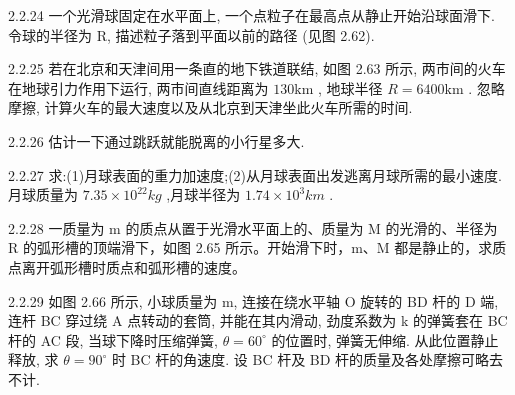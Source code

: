 \begin{problem}{2.2.24}
一个光滑球固定在水平面上, 一个点粒子在最高点从静止开始沿球面滑下. 令球的半径为 R, 描述粒子落到平面以前的路径 (见图 2.62).
\begin{center}

\end{center}
\end{problem}
\clearpage


\begin{problem}{2.2.25}
若在北京和天津间用一条直的地下铁道联结, 如图 2.63 所示, 两市间的火车在地球引力作用下运行, 两市间直线距离为 $130\mathrm{km}$ , 地球半径 $R = 6400\mathrm{km}$ . 忽略摩擦, 计算火车的最大速度以及从北京到天津坐此火车所需的时间.
\begin{center}

\end{center}
\end{problem}
\clearpage


\begin{problem}{2.2.26}
估计一下通过跳跃就能脱离的小行星多大.
\end{problem}
\clearpage


\begin{problem}{2.2.27}
求:(1)月球表面的重力加速度;(2)从月球表面出发逃离月球所需的最小速度.月球质量为 $7.35\times10^{22}kg$ ,月球半径为 $1.74\times10^{3}km$ .
\end{problem}
\clearpage


\begin{problem}{2.2.28}
一质量为 m 的质点从置于光滑水平面上的、质量为 M 的光滑的、半径为 R 的弧形槽的顶端滑下，如图 2.65 所示。开始滑下时，m、M 都是静止的，求质点离开弧形槽时质点和弧形槽的速度。
\begin{center}

\end{center}
\end{problem}
\clearpage


\begin{problem}{2.2.29}
如图 2.66 所示, 小球质量为 m, 连接在绕水平轴 O 旋转的 BD 杆的 D 端, 连杆 BC 穿过绕 A 点转动的套筒, 并能在其内滑动, 劲度系数为 k 的弹簧套在 BC 杆的 AC 段, 当球下降时压缩弹簧, $\theta = 60^{\circ}$ 的位置时, 弹簧无伸缩. 从此位置静止释放, 求 $\theta = 90^{\circ}$ 时 BC 杆的角速度. 设 BC 杆及 BD 杆的质量及各处摩擦可略去不计.
\begin{center}

\end{center}
\end{problem}
\clearpage


